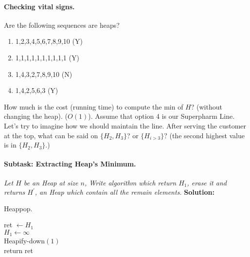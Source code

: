 \paragraph{Checking vital signs.}Are the following sequences are heaps? 
\begin{enumerate}
  \item 1,2,3,4,5,6,7,8,9,10 (Y)
  \item 1,1,1,1,1,1,1,1,1,1  (Y)
  \item 1,4,3,2,7,8,9,10     (N)
  \item 1,4,2,5,6,3	     (Y)
\end{enumerate}
\begin{figure}[h]
  \centering
  \begin{subfigure}[b]{0.3\textwidth}
	
  \end{subfigure}
\begin{subfigure}[b]{0.3\textwidth}
	
  \end{subfigure}
\begin{subfigure}[b]{0.3\textwidth}
	
  \end{subfigure}
\end{figure}
How much is the cost (running time) to compute the min of $H$? (without changing the heap). ($O\left( 1 \right)$). Assume that option 4 is our Superpharm Line. Let's try to imagine how we should maintain the line. After serving the customer at the top, what can be said on $ \{ H_{2}, H_{3}\}$? or $\{H_{i>3}\}?$ (the second highest value is in $\{H_{2}, H_{3} \}$.)   

\paragraph{Subtask: Extracting Heap's Minimum.} \textit{Let $H$ be an Heap at size $n$, Write algorithm which return $H_1$, erase it and returns $H^\prime$, an Heap which contain all the remain elements.} 
\textbf{Solution:} 

\begin{algbox}{Heappop.}
\begin{algorithm}[H]
ret $\leftarrow H_{1} $ \\
$ H_{1} \leftarrow \infty $  \\
Heapify-down$\left( 1 \right)$ \\
return ret  
\end{algorithm}
\end{algbox}



